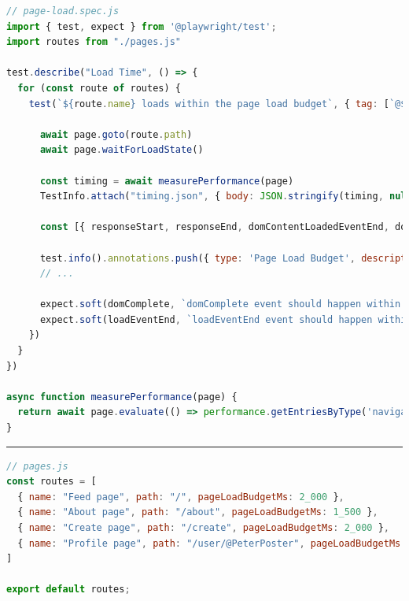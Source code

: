 \documentclass[a4paper, 12pt]{article}
\begin{document}
\vspace{1cm}
\begin{lstlisting}[caption={Test file for page load times}, label={lst:page-load-spec}, language=JavaScript]
// page-load.spec.js
import { test, expect } from '@playwright/test';
import routes from "./pages.js"

test.describe("Load Time", () => {
  for (const route of routes) {
    test(`${route.name} loads within the page load budget`, { tag: [`@${route.name}`, '@pageLoad'] }, async ({ page }, TestInfo) => {

      await page.goto(route.path)
      await page.waitForLoadState()

      const timing = await measurePerformance(page)
      TestInfo.attach("timing.json", { body: JSON.stringify(timing, null, 2), contentType: "application/json" })

      const [{ responseStart, responseEnd, domContentLoadedEventEnd, domComplete, loadEventEnd }] = timing;

      test.info().annotations.push({ type: 'Page Load Budget', description: `The time budget for this page was ${route.pageLoadBudgetMs}ms` });
      // ...

      expect.soft(domComplete, `domComplete event should happen within ${route.pageLoadBudgetMs} ms`).toBeLessThanOrEqual(route.pageLoadBudgetMs)
      expect.soft(loadEventEnd, `loadEventEnd event should happen within ${route.pageLoadBudgetMs} ms`).toBeLessThanOrEqual(route.pageLoadBudgetMs)
    })
  }
})

async function measurePerformance(page) {
  return await page.evaluate(() => performance.getEntriesByType('navigation'));
}

\end{lstlisting}
\hrule
\begin{lstlisting}[caption={Test pages configuration}, label={lst:pages-config}, language=JavaScript]
// pages.js
const routes = [
  { name: "Feed page", path: "/", pageLoadBudgetMs: 2_000 },
  { name: "About page", path: "/about", pageLoadBudgetMs: 1_500 },
  { name: "Create page", path: "/create", pageLoadBudgetMs: 2_000 },
  { name: "Profile page", path: "/user/@PeterPoster", pageLoadBudgetMs: 2_000 },
]

export default routes;
\end{lstlisting}
\vspace{1cm}
\end{document}
